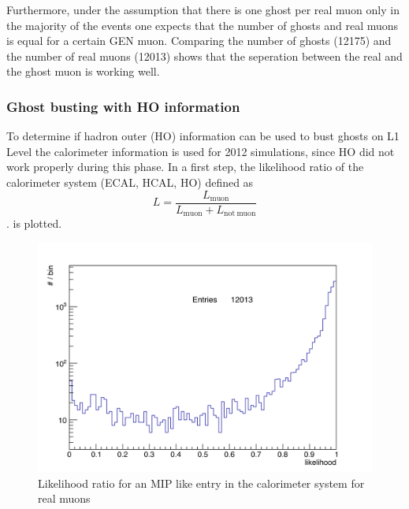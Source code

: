 Furthermore, under the assumption that there is one ghost per real muon only in the majority of the events one expects that the number of ghosts and real muons is equal for a certain GEN muon. Comparing the number of ghosts (12175) and the number of real muons (12013) shows that the seperation between the real and the ghost muon is working well.

\subsubsection{Ghost busting with HO information}
To determine if hadron outer (HO) information can be used to bust ghosts on L1 Level the calorimeter information is used for 2012 simulations, since HO did not work properly during this phase. In a first step, the likelihood ratio of the calorimeter system (ECAL, HCAL, HO) defined as
\begin{equation}
L=\frac{L_{\mathrm{muon}}}{L_{\mathrm{muon}} + L_\mathrm{not\ muon}}
\end{equation}.
is plotted.
\begin{figure}[b]
\centering
\begin{minipage}[t]{0.95\textwidth}
\includegraphics[width=\textwidth]{Figures/scheuch/LikelihoodNonGhost.png}
\caption{Likelihood ratio for an MIP like entry in the calorimeter system for real muons}
\label{LikelihoodReal}
\end{minipage}
\end{figure}

